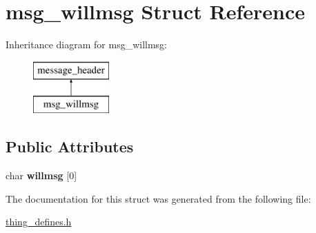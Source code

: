 \hypertarget{structmsg__willmsg}{\section{msg\-\_\-willmsg Struct Reference}
\label{structmsg__willmsg}
}
Inheritance diagram for msg\-\_\-willmsg\-:\begin{figure}[H]
\begin{center}
\leavevmode
\includegraphics[height=2.000000cm]{structmsg__willmsg}
\end{center}
\end{figure}
\subsection*{Public Attributes}
\begin{DoxyCompactItemize}
\item 
\hypertarget{structmsg__willmsg_abfa8a96974590708e5c7264f3cd5f725}{char {\bfseries willmsg} \mbox{[}0\mbox{]}}\label{structmsg__willmsg_abfa8a96974590708e5c7264f3cd5f725}

\end{DoxyCompactItemize}


The documentation for this struct was generated from the following file\-:\begin{DoxyCompactItemize}
\item 
\hyperlink{thing__defines_8h}{thing\-\_\-defines.\-h}\end{DoxyCompactItemize}
